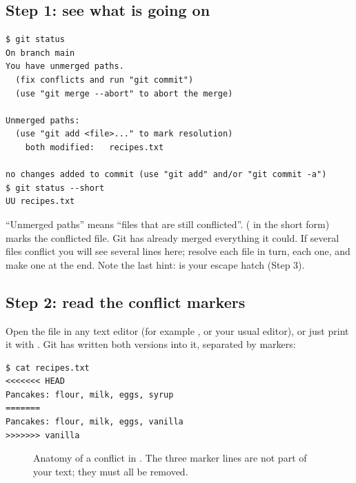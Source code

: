 \subsection{Step 1: see what is going on}

\begin{lstlisting}
$ git status
On branch main
You have unmerged paths.
  (fix conflicts and run "git commit")
  (use "git merge --abort" to abort the merge)

Unmerged paths:
  (use "git add <file>..." to mark resolution)
	both modified:   recipes.txt

no changes added to commit (use "git add" and/or "git commit -a")
$ git status --short
UU recipes.txt
\end{lstlisting}

``Unmerged paths'' means ``files that are still conflicted''.  ( in the short form) marks the conflicted file. Git has already merged everything it could. If several files conflict you will see several lines here; resolve each file in turn,  each one, and make one  at the end. Note the last hint:  is your escape hatch (Step 3).

\subsection{Step 2: read the conflict markers}

Open the file in any text editor (for example , or your usual editor), or just print it with . Git has written both versions into it, separated by markers:

\begin{lstlisting}
$ cat recipes.txt
<<<<<<< HEAD
Pancakes: flour, milk, eggs, syrup
=======
Pancakes: flour, milk, eggs, vanilla
>>>>>>> vanilla
\end{lstlisting}

\begin{figure}[H]
\centering
{}
\caption{Anatomy of a conflict in . The three marker lines are not part of your text; they must all be removed.}
\label{fig:markers}
\end{figure}

